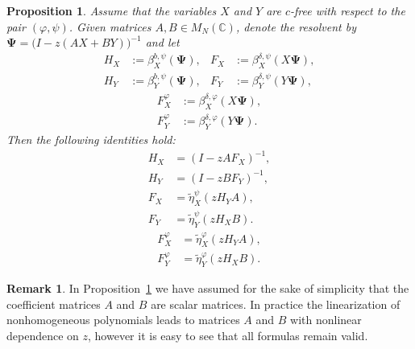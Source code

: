 \documentclass[12pt]{amsart}
\newcommand{\bPsi}{\boldsymbol{\Psi{}}}
\newcommand{\bbetas}[2]{\beta^{b,#1}_{#2}}
\newcommand{\fbetas}[2]{\beta^{\delta,#1}_{#2}}
\newtheorem{proposition}[theorem]{Proposition}
\theoremstyle{definition}
\newtheorem{remark}[theorem]{Remark}
\numberwithin{equation}{section}
\begin{document}
\begin{proposition}
  \label{lem:SeveralEquations}
  Assume that the variables $X$ and $Y$ are $c$-free with respect
  to the pair $(\varphi,\psi)$.
  Given matrices  $A,B\in M_N(\mathbb{C})$,
  denote the resolvent by $\bPsi = \bigl(I - z(AX+BY)\bigr)^{-1}$  and let
  \begin{align}
    H_X & :=\bbetas{\psi}{X}(\bPsi),
    &
      F_X & :=\fbetas{\psi}{X}(X\bPsi), \\
    \label{eq:def:HYFY}
    H_Y & :=\bbetas{\psi}{Y}(\bPsi),
    &
      F_Y & :=\fbetas{\psi}{Y}(Y\bPsi) ,
  \end{align}
  \begin{align}
    \label{eq:def:FXphi}    
    F_X^\varphi & :=\fbetas{\varphi}{X}(X\bPsi), \\
    F_Y^\varphi & :=\fbetas{\varphi}{Y}(Y\bPsi).
  \end{align}
  Then the following identities hold:
  \begin{align}
    H_X &=  (I-zAF_X)^{-1},\label{eq:HAdditive}\\
    H_Y &= (I-zBF_Y)^{-1},\label{eq:HYAdditive}\\
    F_X &= \tilde{\eta}_X^{\psi}\left(z H_Y A \right),\label{eq:Fx=betasubordination}\\
    F_Y &= \tilde{\eta}_Y^{\psi}\left(zH_X B \right).
  \end{align}
  \begin{align}
    F_X^\varphi &= \tilde{\eta}^\varphi_X(zH_YA),\label{eq:Fxphi=betasubordination}\\
    F_Y^\varphi &= \tilde{\eta}^\varphi_Y(zH_XB)\label{eq:Fyphi=betasubordination}.
  \end{align}
\end{proposition}
\begin{remark}
  In Proposition~\ref{lem:SeveralEquations}
  we have assumed for the sake of simplicity that
  the coefficient matrices $A$ and $B$ are scalar matrices.
  In practice the linearization of nonhomogeneous polynomials
  leads to matrices $A$ and $B$ with nonlinear dependence on $z$,
  however it is easy to see that all formulas remain valid.
\end{remark}
\end{document}
